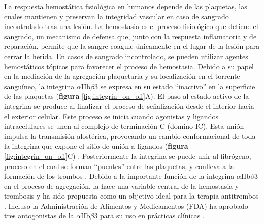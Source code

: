 La respuesta hemostática fisiológica en humanos depende de las plaquetas, las cuales mantienen y preservan la integridad vascular en caso de sangrado incontrolado tras una lesión. La hemostasia es el proceso fisiológico que detiene el sangrado, un mecanismo de defensa que, junto con la respuesta inflamatoria y de reparación, permite que la sangre coagule únicamente en el lugar de la lesión para cerrar la herida. En casos de sangrado incontrolado, se pueden utilizar agentes hemostáticos tópicos para favorecer el proceso de hemostasia. Debido a su papel en la mediación de la agregación plaquetaria y su localización en el torrente sanguíneo, la integrina $\alpha$IIb$\beta$3 se expresa en su estado ``inactivo'' en la superficie de las plaquetas (\textbf{figura} \ref{fig:integrin_on_off}A). El paso al estado activo  de la integrina se produce al finalizar el proceso de señalización desde el interior hacia el exterior celular. Este proceso se inicia cuando agonistas y ligandos intracelulares se unen al complejo de terminación C (domino IC). Esta unión impulsa la transmisión alostérica, provocando un cambio conformacional de toda la integrina que expone el sitio de unión a ligandos (\textbf{figura} \ref{fig:integrin_on_off}C) \citep{Kadry2020, Lu2022}. Posteriormente la integrina se puede unir al fibrógeno, proceso en el cual se forman ``puentes'' entre las plaquetas, y conlleva a la formación de los trombos \citep{Kaneva2019}. Debido a la importante función de la integrina $\alpha$IIb$\beta$3 en el proceso de agregación, la hace una variable central de la hemostasia y trombosis y ha sido propuesta como un objetivo ideal para la terapia antitrombos \citep{Huang2019, Xiang2019}. Incluso la Administración de Alimentos y Medicamentos (FDA) ha aprobado tres antogonistas de la $\alpha$IIb$\beta$3 para su uso en prácticas clínicas \citep{Bledzka2013, Coller1997, Scarborough2000}.


